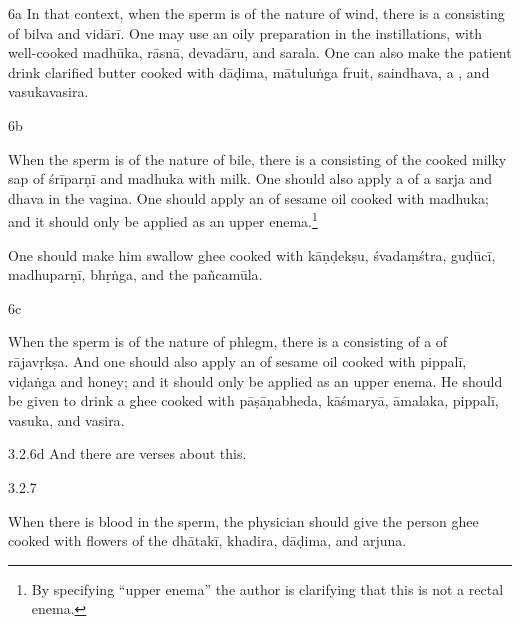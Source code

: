 \begin{translation}
\begin{sloka}
 \end{sloka}
 
 \item[6a] In that context, when the sperm is of the nature of wind, there is
a 
consisting of \gls{bilva} and \gls{vidārī}.
% 
One may use an oily preparation in the instillations, with well-cooked
\gls{madhūka}, \gls{rāsnā}, \gls{devadāru}, and \gls{sarala}.
%
One can also make the patient drink clarified butter cooked with
\gls{dāḍima}, \gls{mātuluṅga} fruit, \gls{saindhava}, a
, and \gls{vasukavasira}.
 
 
 
 \item[6b]
 
 When the sperm is of the nature of bile, there is  a
   consisting of the cooked milky sap of 
  \gls{śrīparṇī} and \gls{madhuka} with milk.
  One should also apply a  of a
  \gls{sarja} and \gls{dhava}
  in the vagina.  
 One should apply an  of sesame oil cooked with 
 \gls{madhuka}; and it should only be applied as an upper enema.\footnote{By 
 specifying 
 “upper enema” the author is clarifying that this is not a rectal enema.}

  One should make him swallow ghee cooked with 
  \gls{kāṇḍekṣu},
  \gls{śvadaṃśtra},
  \gls{guḍūcī},
  \gls{madhuparṇī},
  \gls{bhṛṅga},
  and 
  the \gls{pañcamūla}.
  
 \item[6c]
 
  When the sperm is of the nature of phlegm, there is  a
 consisting of a   of
\gls{rājavṛkṣa}.  And one should also apply an  of sesame oil cooked with \gls{pippalī}, \gls{viḍaṅga} and
honey; and it should only be applied as an upper enema. 
He should be given to drink a ghee cooked with 
\gls{pāṣāṇabheda},
\gls{kāśmaryā},
\gls{āmalaka},
\gls{pippalī},
\gls{vasuka}, and 
\gls{vasira}.
 
 
 \item[3.2.6d]  And there are verses about this.
 
 \item [3.2.7]
 
 \begin{sloka}
     When there is blood in the sperm, the physician should give the person ghee 
 cooked with 
 flowers of the \gls{dhātakī},
 \gls{khadira},
 \gls{dāḍima},
 and \gls{arjuna}.
 \end{sloka}
 

\end{translation}
